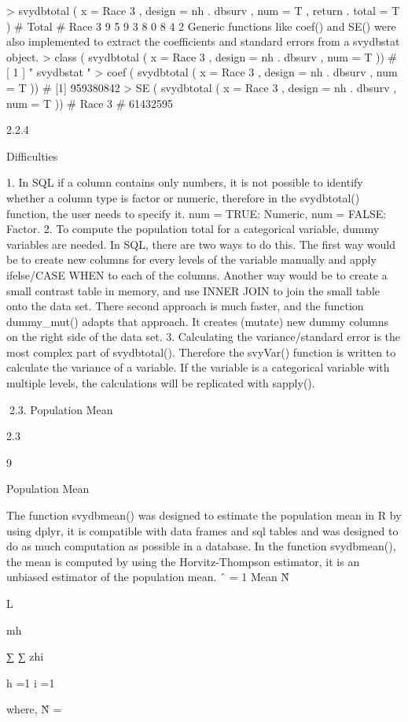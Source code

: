 > svydbtotal ( x = Race 3 , design = nh . dbsurv , num = T ,
return . total = T )
#
Total
# Race 3 9 5 9 3 8 0 8 4 2
Generic functions like coef() and SE() were also implemented to extract the
coefficients and standard errors from a svydbstat object.
> class ( svydbtotal ( x = Race 3 , design = nh . dbsurv , num = T ))
# [ 1 ] " svydbstat "
> coef ( svydbtotal ( x = Race 3 , design = nh . dbsurv , num = T ))
# [1] 959380842
> SE ( svydbtotal ( x = Race 3 , design = nh . dbsurv , num = T ))
#
Race 3
# 61432595

2.2.4

Difficulties

1. In SQL if a column contains only numbers, it is not possible to identify whether
a column type is factor or numeric, therefore in the svydbtotal() function, the
user needs to specify it. num = TRUE: Numeric, num = FALSE: Factor.
2. To compute the population total for a categorical variable, dummy variables
are needed. In SQL, there are two ways to do this. The first way would be
to create new columns for every levels of the variable manually and apply
ifelse/CASE WHEN to each of the columns. Another way would be to create
a small contrast table in memory, and use INNER JOIN to join the small table
onto the data set. There second approach is much faster, and the function
dummy_mut() adapts that approach. It creates (mutate) new dummy columns
on the right side of the data set.
3. Calculating the variance/standard error is the most complex part of svydbtotal().
Therefore the svyVar() function is written to calculate the variance of a variable. If the variable is a categorical variable with multiple levels, the calculations will be replicated with sapply().

2.3. Population Mean

2.3

9

Population Mean

The function svydbmean() was designed to estimate the population mean in R by
using dplyr, it is compatible with data frames and sql tables and was designed to do
as much computation as possible in a database.
In the function svydbmean(), the mean is computed by using the Horvitz-Thompson
estimator, it is an unbiased estimator of the population mean.
ˆ = 1
Mean
N̂

L

mh

∑ ∑ zhi

h =1 i =1

where,
N̂ =

